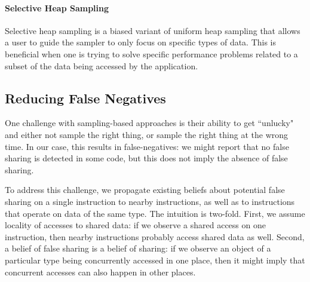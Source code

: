 \documentclass{sig-alternate}
\begin{document}
\paragraph{Selective Heap Sampling}
Selective heap sampling is a biased variant of uniform heap sampling that allows a user to guide the sampler to only focus
on specific types of data. This is beneficial when one is trying to solve specific performance problems related to a subset
of the data being accessed by the application.

\subsection{Reducing False Negatives}\label{sec:falsenegs}

One challenge with sampling-based approaches is their ability to get ``unlucky" and either not sample
the right thing, or sample the right thing at the wrong time. In our case, this results in false-negatives:
we might report that no false sharing is detected in some code, but this does not imply the absence of
false sharing.

To address this challenge, we propagate existing beliefs about potential false sharing on a single instruction
to nearby instructions, as well as to instructions that operate on data of the same type. The intuition is
two-fold. First, we assume locality of accesses to shared data: if we observe a shared access on one instruction,
then nearby instructions probably access shared data as well. Second, a belief of false sharing is a belief of
sharing: if we observe an object of a particular type being concurrently accessed in one place, then it might
imply that concurrent accesses can also happen in other places.
\end{document}
